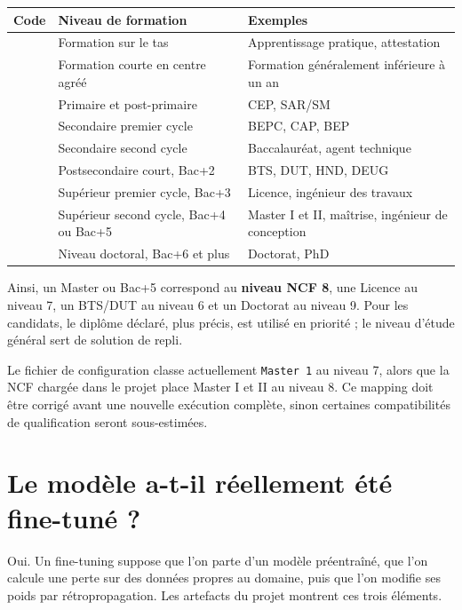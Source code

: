 \documentclass[12pt,a4paper]{article}
\begin{document}
\renewcommand{\arraystretch}{1.12}
\begin{tabularx}{\textwidth}{>{\centering\arraybackslash}p{}X>{\raggedright\arraybackslash}p{}}
\toprule
\textbf{Code} & \textbf{Niveau de formation} & \textbf{Exemples} \\
\midrule
1 & Formation sur le tas & Apprentissage pratique, attestation \\
2 & Formation courte en centre agréé & Formation généralement inférieure à un an \\
3 & Primaire et post-primaire & CEP, SAR/SM \\
4 & Secondaire premier cycle & BEPC, CAP, BEP \\
5 & Secondaire second cycle & Baccalauréat, agent technique \\
6 & Postsecondaire court, Bac+2 & BTS, DUT, HND, DEUG \\
7 & Supérieur premier cycle, Bac+3 & Licence, ingénieur des travaux \\
8 & Supérieur second cycle, Bac+4 ou Bac+5 & Master I et II, maîtrise, ingénieur de conception \\
9 & Niveau doctoral, Bac+6 et plus & Doctorat, PhD \\
\bottomrule
\end{tabularx}

Ainsi, un Master ou Bac+5 correspond au \textbf{niveau NCF 8}, une Licence au niveau 7,
un BTS/DUT au niveau 6 et un Doctorat au niveau 9. Pour les candidats, le diplôme déclaré,
plus précis, est utilisé en priorité ; le niveau d'étude général sert de solution de repli.

\begin{alertbox}
Le fichier de configuration classe actuellement \texttt{Master 1} au niveau 7, alors que la NCF
chargée dans le projet place Master I et II au niveau 8. Ce mapping doit être corrigé avant une
nouvelle exécution complète, sinon certaines compatibilités de qualification seront sous-estimées.
\end{alertbox}

\section{Le modèle a-t-il réellement été fine-tuné ?}

Oui. Un fine-tuning suppose que l'on parte d'un modèle préentraîné, que l'on calcule une perte
sur des données propres au domaine, puis que l'on modifie ses poids par rétropropagation.
Les artefacts du projet montrent ces trois éléments.
\end{document}

